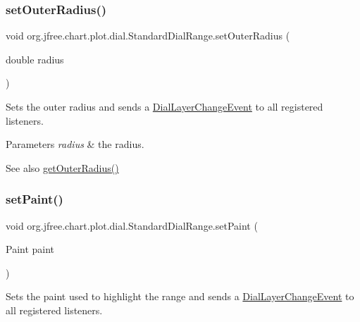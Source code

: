 \subsubsection{\texorpdfstring{set\+Outer\+Radius()}{setOuterRadius()}}
{\footnotesize\ttfamily void org.\+jfree.\+chart.\+plot.\+dial.\+Standard\+Dial\+Range.\+set\+Outer\+Radius (\begin{DoxyParamCaption}\item[{double}]{radius }\end{DoxyParamCaption})}

Sets the outer radius and sends a \mbox{\hyperlink{classorg_1_1jfree_1_1chart_1_1plot_1_1dial_1_1_dial_layer_change_event}{Dial\+Layer\+Change\+Event}} to all registered listeners.


\begin{DoxyParams}{Parameters}
{\em radius} & the radius.\\
\hline
\end{DoxyParams}
\begin{DoxySeeAlso}{See also}
\mbox{\hyperlink{classorg_1_1jfree_1_1chart_1_1plot_1_1dial_1_1_standard_dial_range_a46f44c8aa6eabe91b754ee9a852a6740}{get\+Outer\+Radius()}} 
\end{DoxySeeAlso}
\mbox{\label{classorg_1_1jfree_1_1chart_1_1plot_1_1dial_1_1_standard_dial_range_a00c1867bb1933c1aaa11327e2c70e237}} 
\subsubsection{\texorpdfstring{set\+Paint()}{setPaint()}}
{\footnotesize\ttfamily void org.\+jfree.\+chart.\+plot.\+dial.\+Standard\+Dial\+Range.\+set\+Paint (\begin{DoxyParamCaption}\item[{Paint}]{paint }\end{DoxyParamCaption})}

Sets the paint used to highlight the range and sends a \mbox{\hyperlink{classorg_1_1jfree_1_1chart_1_1plot_1_1dial_1_1_dial_layer_change_event}{Dial\+Layer\+Change\+Event}} to all registered listeners.


